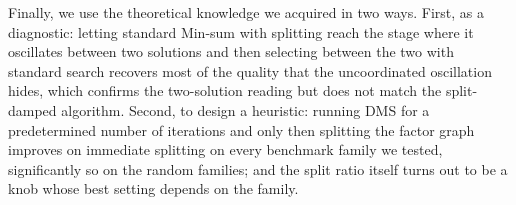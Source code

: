 Finally, we use the theoretical knowledge we acquired in two ways. First, as a diagnostic: letting standard Min-sum with splitting reach the stage where it oscillates between two solutions and then selecting between the two with standard search recovers most of the quality that the uncoordinated oscillation hides, which confirms the two-solution reading but does not match the split-damped algorithm. Second, to design a heuristic: running DMS for a predetermined number of iterations and only then splitting the factor graph improves on immediate splitting on every benchmark family we tested, significantly so on the random families; and the split ratio itself turns out to be a knob whose best setting depends on the family.

